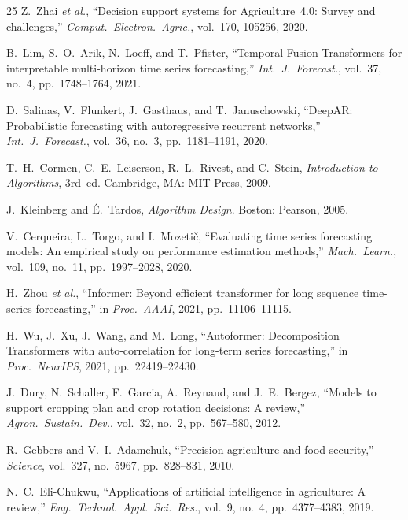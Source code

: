 \documentclass[journal]{IEEEtran}
\begin{document}
\begin{thebibliography}{25}
Z.~Zhai \textit{et al.}, ``Decision support systems for Agriculture~4.0: Survey and challenges,'' \textit{Comput.\ Electron.\ Agric.}, vol.~170, 105256, 2020.

B.~Lim, S.~O.~Arik, N.~Loeff, and T.~Pfister, ``Temporal Fusion Transformers for interpretable multi-horizon time series forecasting,'' \textit{Int.\ J.\ Forecast.}, vol.~37, no.~4, pp.~1748--1764, 2021.

D.~Salinas, V.~Flunkert, J.~Gasthaus, and T.~Januschowski, ``DeepAR: Probabilistic forecasting with autoregressive recurrent networks,'' \textit{Int.\ J.\ Forecast.}, vol.~36, no.~3, pp.~1181--1191, 2020.

T.~H.~Cormen, C.~E.~Leiserson, R.~L.~Rivest, and C.~Stein, \textit{Introduction to Algorithms}, 3rd~ed.\hspace{0.5em} Cambridge, MA: MIT Press, 2009.

J.~Kleinberg and \'E.~Tardos, \textit{Algorithm Design}.\hspace{0.5em} Boston: Pearson, 2005.

V.~Cerqueira, L.~Torgo, and I.~Mozeti\v{c}, ``Evaluating time series forecasting models: An empirical study on performance estimation methods,'' \textit{Mach.\ Learn.}, vol.~109, no.~11, pp.~1997--2028, 2020.

H.~Zhou \textit{et al.}, ``Informer: Beyond efficient transformer for long sequence time-series forecasting,'' in \textit{Proc.\ AAAI}, 2021, pp.~11106--11115.

H.~Wu, J.~Xu, J.~Wang, and M.~Long, ``Autoformer: Decomposition Transformers with auto-correlation for long-term series forecasting,'' in \textit{Proc.\ NeurIPS}, 2021, pp.~22419--22430.

J.~Dury, N.~Schaller, F.~Garcia, A.~Reynaud, and J.~E.~Bergez, ``Models to support cropping plan and crop rotation decisions: A review,'' \textit{Agron.\ Sustain.\ Dev.}, vol.~32, no.~2, pp.~567--580, 2012.

R.~Gebbers and V.~I.~Adamchuk, ``Precision agriculture and food security,'' \textit{Science}, vol.~327, no.~5967, pp.~828--831, 2010.

N.~C.~Eli-Chukwu, ``Applications of artificial intelligence in agriculture: A review,'' \textit{Eng.\ Technol.\ Appl.\ Sci.\ Res.}, vol.~9, no.~4, pp.~4377--4383, 2019.

\end{thebibliography}
\end{document}
